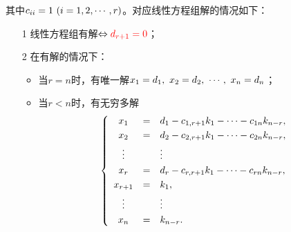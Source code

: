 其中$c_{ii}=1~(i=1,2,\cdots,r)$。对应线性方程组解的情况如下：   
\begin{itemize}
\item[1] 线性方程组有解$ \Leftrightarrow \textcolor{red}{d_{r+1}=0}$；\\[0.3cm]
\item[2] 在有解的情况下：
  \begin{itemize}
  \item 当$r=n$时，有唯一解$x_1=d_1,~x_2=d_2,~\cdots,~x_n=d_n$；
  \item 当$r<n$时，有无穷多解
    $$
    \left\{
      \begin{array}{ccl}
        x_1 &=& d_1 - c_{1,r+1}k_1 - \cdots - c_{1n}k_{n-r}, \\[0.1cm]
        x_2 &=& d_2 - c_{2,r+1}k_1 - \cdots - c_{2n}k_{n-r}, \\[0.1cm]
        \vdots & & \vdots \\[0.1cm]
        x_r &=& d_r - c_{r,r+1}k_1 - \cdots - c_{rn}k_{n-r}, \\[0.1cm]
        x_{r+1} &=& k_1, \\[0.1cm]
        \vdots && \vdots \\[0.1cm]
        x_{n} &=& k_{n-r}.
      \end{array}
    \right.
    $$
  \end{itemize}
\end{itemize}
